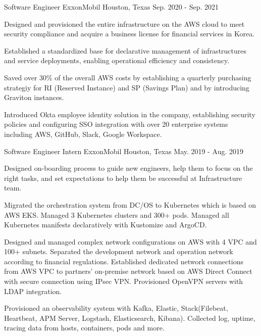\begin{cventries}
  \cventry
    {Software Engineer} %
    {ExxonMobil} %
    {Houston, Texas} %
    {Sep. 2020 - Sep. 2021} %
    {
      \begin{cvitems} %
        \item {Designed and provisioned the entire infrastructure on the AWS cloud to meet security compliance
        and acquire a business license for financial services in Korea.}
        \item {Established a standardized base for declarative management of infrastructures and service deployments,
          enabling operational efficiency and consistency.}
        \item {Saved over 30\% of the overall AWS costs by establishing a quarterly purchasing strategiy for
        RI (Reserved Instance) and SP (Savings Plan) and by introducing Graviton instances.}
        \item {Introduced Okta employee identity solution in the company, establishing security policies
        and configuring SSO integration with over 20 enterprise systems including AWS, GitHub, Slack, Google Workspace.}
      \end{cvitems}
    }

  \cventry
    {Software Engineer Intern} %
    {ExxonMobil} %
    {Houston, Texas} %
    {May. 2019 - Aug. 2019} %
    {
      \begin{cvitems} %
        \item {Designed on-boarding process to guide new engineers, help them to focus on the right tasks,
          and set expectations to help them be successful at Infrastructure team.}
        \item {Migrated the orchestration system from DC/OS to Kubernetes which is based on AWS EKS.
        Managed 3 Kubernetes clusters and 300+ pods.
        Managed all Kubernetes manifests declaratively with Kustomize and ArgoCD.}
        \item {Designed and managed complex network configurations on AWS with 4 VPC and 100+ subnets.
        Separated the development network and operation network according to financial regulations.
        Established dedicated network connections from AWS VPC to partners' on-premise network based on
        AWS Direct Connect with secure connection using IPsec VPN.
        Provisioned OpenVPN servers with LDAP integration.}
        \item {Provisioned an observability system with Kafka, Elastic, Stack(Filebeat, Heartbeat, APM Server, Logstash, Elasticsearch, Kibana).
        Collected log, uptime, tracing data from hosts, containers, pods and more.}
      \end{cvitems}
    }
\end{cventries}